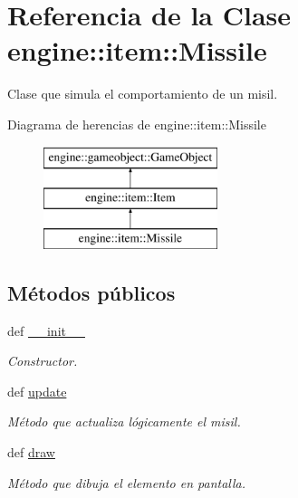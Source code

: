 \hypertarget{classengine_1_1item_1_1Missile}{
\section{\-Referencia de la \-Clase engine\-:\-:item\-:\-:\-Missile}
\label{classengine_1_1item_1_1Missile}
}


\-Clase que simula el comportamiento de un misil.  


\-Diagrama de herencias de engine\-:\-:item\-:\-:\-Missile\begin{figure}[H]
\begin{center}
\leavevmode
\includegraphics[height=3.000000cm]{classengine_1_1item_1_1Missile}
\end{center}
\end{figure}
\subsection*{\-Métodos públicos}
\begin{DoxyCompactItemize}
\item 
def \hyperlink{classengine_1_1item_1_1Missile_a437732d89bd2b347c3c5aa381a5ad4e5}{\-\_\-\-\_\-init\-\_\-\-\_\-}
\begin{DoxyCompactList}\small\item\em \-Constructor. \end{DoxyCompactList}\item 
\hypertarget{classengine_1_1item_1_1Missile_a104148a1e491a48f0eb42371cd86cbde}{
def \hyperlink{classengine_1_1item_1_1Missile_a104148a1e491a48f0eb42371cd86cbde}{update}}
\label{classengine_1_1item_1_1Missile_a104148a1e491a48f0eb42371cd86cbde}

\begin{DoxyCompactList}\small\item\em \-Método que actualiza lógicamente el misil. \end{DoxyCompactList}\item 
def \hyperlink{classengine_1_1item_1_1Missile_a70bd93e324c784b7e61c0c251ae31a91}{draw}
\begin{DoxyCompactList}\small\item\em \-Método que dibuja el elemento en pantalla. \end{DoxyCompactList}\end{DoxyCompactItemize}
